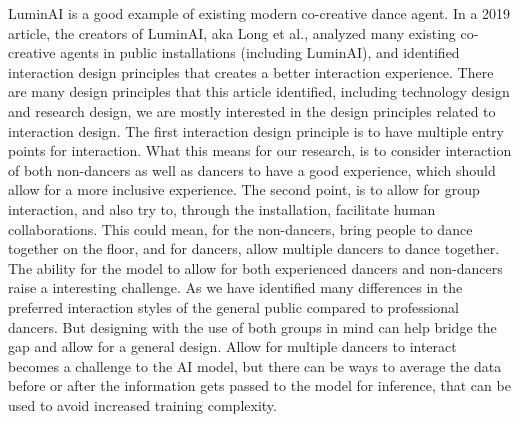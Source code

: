 \documentclass[final,5p,times,twocolumn,authoryear]{article}
\begin{document}
LuminAI is a good example of existing modern co-creative dance agent. In
a 2019 article, the creators of LuminAI, aka Long et al., analyzed many
existing co-creative agents in public installations (including LuminAI),
and identified interaction design principles that creates a better
interaction experience. There are many design principles that this
article identified, including technology design and research design, we
are mostly interested in the design principles related to interaction
design. The first interaction design principle is to have multiple entry
points for interaction. What this means for our research, is to consider
interaction of both non-dancers as well as dancers to have a good
experience, which should allow for a more inclusive experience. The
second point, is to allow for group interaction, and also try to,
through the installation, facilitate human collaborations.  This could
mean, for the non-dancers, bring people to dance together on the floor,
and for dancers, allow multiple dancers to dance together.  The ability
for the model to allow for both experienced dancers and non-dancers
raise a interesting challenge. As we have identified many differences in
the preferred interaction styles of the general public compared to
professional dancers. But designing with the use of both groups in mind
can help bridge the gap and allow for a general design.  Allow for
multiple dancers to interact becomes a challenge to the AI model, but
there can be ways to average the data before or after the information
gets passed to the model for inference, that can be used to avoid
increased training complexity.
\end{document}
